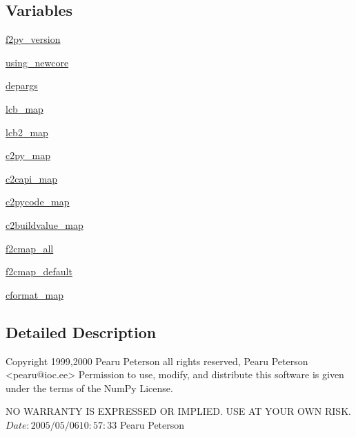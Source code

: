 \subsection*{Variables}
\begin{DoxyCompactItemize}
\item 
\hyperlink{namespacenumpy_1_1f2py_1_1capi__maps_acb330907e92f50ebc20b7df2bbdb9839}{f2py\+\_\+version}
\item 
\hyperlink{namespacenumpy_1_1f2py_1_1capi__maps_a1dd70a9c1d03d4354013a39c7c0e5235}{using\+\_\+newcore}
\item 
\hyperlink{namespacenumpy_1_1f2py_1_1capi__maps_a73dcbe630cbe16d9e89da01fca83909d}{depargs}
\item 
\hyperlink{namespacenumpy_1_1f2py_1_1capi__maps_a34bd9b5a898c6786b0b2c6e81c29d22c}{lcb\+\_\+map}
\item 
\hyperlink{namespacenumpy_1_1f2py_1_1capi__maps_a11f540426a42f7bbcdd08081e3d05c98}{lcb2\+\_\+map}
\item 
\hyperlink{namespacenumpy_1_1f2py_1_1capi__maps_af3b6bbf3f6e482b31c598a94df8a6f75}{c2py\+\_\+map}
\item 
\hyperlink{namespacenumpy_1_1f2py_1_1capi__maps_ae9213dd2e503ff2ba6c603f24e2950cb}{c2capi\+\_\+map}
\item 
\hyperlink{namespacenumpy_1_1f2py_1_1capi__maps_a97c95112862c7a203db61d521576df7d}{c2pycode\+\_\+map}
\item 
\hyperlink{namespacenumpy_1_1f2py_1_1capi__maps_aaaeda771639f9a9dbc52c2ab5bad1d24}{c2buildvalue\+\_\+map}
\item 
\hyperlink{namespacenumpy_1_1f2py_1_1capi__maps_a0b4e7873b8247235a91ff692ba7521d6}{f2cmap\+\_\+all}
\item 
\hyperlink{namespacenumpy_1_1f2py_1_1capi__maps_ac227f3a829069bb2fb421c15e82bd1df}{f2cmap\+\_\+default}
\item 
\hyperlink{namespacenumpy_1_1f2py_1_1capi__maps_aa3fd4481ee22811d69506ab7a7563896}{cformat\+\_\+map}
\end{DoxyCompactItemize}


\subsection{Detailed Description}
\begin{DoxyVerb}Copyright 1999,2000 Pearu Peterson all rights reserved,
Pearu Peterson <pearu@ioc.ee>
Permission to use, modify, and distribute this software is given under the
terms of the NumPy License.

NO WARRANTY IS EXPRESSED OR IMPLIED.  USE AT YOUR OWN RISK.
$Date: 2005/05/06 10:57:33 $
Pearu Peterson\end{DoxyVerb}
 

